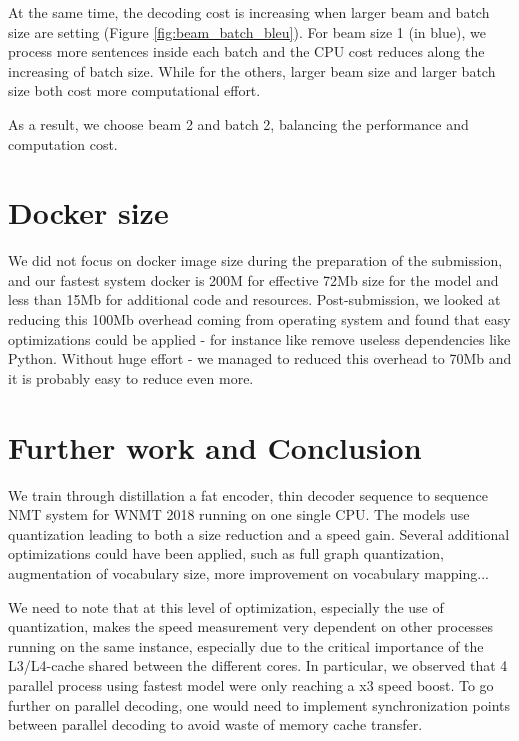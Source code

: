 \documentclass[11pt,a4paper]{article}
\begin{document}
%

At the same time, the decoding cost is increasing when larger beam and batch size are setting (Figure \ref{fig:beam_batch_bleu}).
For beam size 1 (in blue), we process more sentences inside each batch and the CPU cost reduces along the increasing of batch size.
While for the others, larger beam size and larger batch size both cost more computational effort.

As a result, we choose beam 2 and batch 2, balancing the performance and computation cost.

%

\section{Docker size}
We did not focus on docker image size during the preparation of the submission, and our fastest system docker is 200M for effective 72Mb size for the model and less than 15Mb for additional code and resources. Post-submission, we looked at reducing this 100Mb overhead coming from operating system and found that easy optimizations could be applied - for instance like remove useless dependencies like Python. Without huge effort - we managed to reduced this overhead to 70Mb and it is probably easy to reduce even more.

\section{Further work and Conclusion}

We train through distillation a fat encoder, thin decoder sequence to sequence NMT system for WNMT 2018 running on one single CPU. The models use quantization leading to both a size reduction and a speed gain. Several additional optimizations could have been applied, such as full graph quantization, augmentation of vocabulary size, more improvement on vocabulary mapping...


We need to note that at this level of optimization, especially the use of quantization, makes the speed measurement very dependent on other processes running on the same instance, especially due to the critical importance of the L3/L4-cache shared between the different cores. In particular, we observed that 4 parallel process using fastest model were only reaching a x3 speed boost. To go further on parallel decoding, one would need to implement synchronization points between parallel decoding to avoid waste of memory cache transfer.
\end{document}
